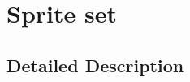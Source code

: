 \hypertarget{group____sprite__set}{\section{Sprite set}
\label{group____sprite__set}
}


\subsection{Detailed Description}
